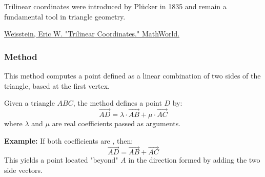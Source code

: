 \medskip
\noindent
Trilinear coordinates were introduced by Plücker in 1835 and remain a fundamental tool in triangle geometry.
\begin{flushright}
\small
\href{https://mathworld.wolfram.com/TrilinearCoordinates.html}{Weisstein, Eric W. "Trilinear Coordinates." MathWorld.}
\end{flushright}

\vspace{1em}
\begin{tkzexample}[latex=.5\textwidth]
\begin{center}
\end{center}
\end{tkzexample}

\subsubsection{Method } %
\label{ssub:method_triangle_base}

This method computes a point defined as a linear combination of two sides of the triangle, based at the first vertex.

\medskip
\noindent
Given a triangle $ABC$, the method defines a point $D$ by:
\[
\overrightarrow{AD} = \lambda \cdot \overrightarrow{AB} + \mu \cdot \overrightarrow{AC}
\]
where $\lambda$ and $\mu$ are real coefficients passed as arguments.

\medskip
\noindent
\textbf{Example:} If both coefficients are , then:
\[
\overrightarrow{AD} = \overrightarrow{AB} + \overrightarrow{AC}
\]
This yields a point located "beyond" $A$ in the direction formed by adding the two side vectors.

\begin{mybox}
\end{mybox}

\vspace{1em}

\begin{tkzexample}[latex=.5\textwidth]
\begin{center}
\end{center}
\end{tkzexample}

